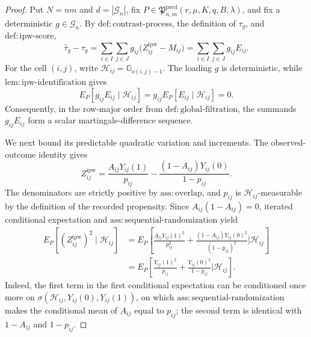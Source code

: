 \documentclass{article}
\begin{document}
\begin{proof}
Put \(N=nm\) and \(d=|\mathcal G_n|\), fix \(P\in\mathfrak P^{\mathrm{pred}}_{n,m}(r,\mu,K,q,B,\lambda)\), and fix a deterministic \(g\in\mathcal G_n\).  By \(\mathrm{def:contrast\mbox{-}process}\), the definition of \(\tau_g\), and \(\mathrm{def:ipw\mbox{-}score}\),
\[
 \widehat\tau_g-\tau_g
 =\sum_{i\in I}\sum_{j\in J}g_{ij}
   \bigl(Z^{\mathrm{ipw}}_{ij}-M_{ij}\bigr)
 =\sum_{i\in I}\sum_{j\in J}g_{ij}E_{ij}.
\]
For the cell \((i,j)\), write \(\mathcal H_{ij}=\mathbb G_{o(i,j)-1}\).  The loading \(g\) is deterministic, while \(\mathrm{lem:ipw\mbox{-}identification}\) gives
\[
 E_P[g_{ij}E_{ij}\mid\mathcal H_{ij}]
 =g_{ij}E_P[E_{ij}\mid\mathcal H_{ij}]=0.
\]
Consequently, in the row-major order from \(\mathrm{def:global\mbox{-}filtration}\), the summands \(g_{ij}E_{ij}\) form a scalar martingale-difference sequence.

We next bound its predictable quadratic variation and increments.  The observed-outcome identity gives
\[
 Z^{\mathrm{ipw}}_{ij}
 =\frac{A_{ij}Y_{ij}(1)}{p_{ij}}
  -\frac{(1-A_{ij})Y_{ij}(0)}{1-p_{ij}}.
\]
The denominators are strictly positive by \(\mathrm{ass:overlap}\), and \(p_{ij}\) is \(\mathcal H_{ij}\)-measurable by the definition of the recorded propensity.  Since \(A_{ij}(1-A_{ij})=0\), iterated conditional expectation and \(\mathrm{ass:sequential\mbox{-}randomization}\) yield
\[
\begin{aligned}
 E_P\!\left[(Z^{\mathrm{ipw}}_{ij})^2\mid\mathcal H_{ij}\right]
 &=E_P\!\left[
   \frac{A_{ij}Y_{ij}(1)^2}{p_{ij}^2}
   +\frac{(1-A_{ij})Y_{ij}(0)^2}{(1-p_{ij})^2}
   \mathrel{\Big|}\mathcal H_{ij}\right]\\
 &=E_P\!\left[
   \frac{Y_{ij}(1)^2}{p_{ij}}
   +\frac{Y_{ij}(0)^2}{1-p_{ij}}
   \mathrel{\Big|}\mathcal H_{ij}\right].
\end{aligned}
\]
Indeed, the first term in the first conditional expectation can be conditioned once more on \(\sigma(\mathcal H_{ij},Y_{ij}(0),Y_{ij}(1))\), on which \(\mathrm{ass:sequential\mbox{-}randomization}\) makes the conditional mean of \(A_{ij}\) equal to \(p_{ij}\); the second term is identical with \(1-A_{ij}\) and \(1-p_{ij}\).


\end{proof}
\end{document}
